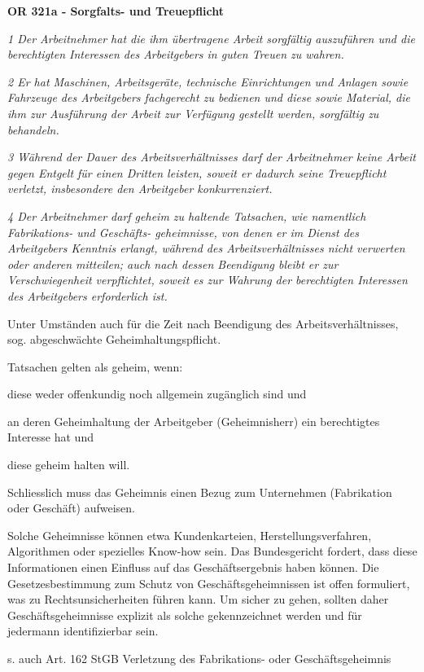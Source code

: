 \noindent
\textbf{OR 321a - Sorgfalts- und Treuepflicht}

\textit{1 Der Arbeitnehmer hat die ihm übertragene Arbeit sorgfältig auszuführen und die berechtigten Interessen des Arbeitgebers in guten Treuen zu wahren.}

\textit{2 Er hat Maschinen, Arbeitsgeräte, technische Einrichtungen und Anlagen sowie Fahrzeuge des Arbeitgebers fachgerecht zu bedienen und diese sowie Material, die ihm zur Ausführung der Arbeit zur Verfügung gestellt werden, sorgfältig zu behandeln.}

\textit{3 Während der Dauer des Arbeitsverhältnisses darf der Arbeitnehmer keine Arbeit gegen Entgelt für einen Dritten leisten, soweit er dadurch seine Treuepflicht verletzt, insbesondere den Arbeitgeber konkurrenziert.}

\textit{4 Der Arbeitnehmer darf geheim zu haltende Tatsachen, wie namentlich Fabrikations- und Geschäfts- geheimnisse, von denen er im Dienst des Arbeitgebers Kenntnis erlangt, während des Arbeitsverhältnisses nicht verwerten oder anderen mitteilen; auch nach dessen Beendigung bleibt er zur Verschwiegenheit verpflichtet, soweit es zur Wahrung der berechtigten Interessen des Arbeitgebers erforderlich ist.}
\vspace{3mm}

\noindent
Unter Umständen auch für die Zeit nach Beendigung des Arbeitsverhältnisses, sog. abgeschwächte Geheimhaltungspflicht.

\noindent
Tatsachen gelten als geheim, wenn: 

diese weder offenkundig noch allgemein zugänglich sind und

an deren Geheimhaltung der Arbeitgeber (Geheimnisherr) ein berechtigtes Interesse hat und

diese geheim halten will.

Schliesslich muss das Geheimnis einen Bezug zum Unternehmen (Fabrikation oder Geschäft) aufweisen.

Solche Geheimnisse können etwa Kundenkarteien, Herstellungsverfahren, Algorithmen oder spezielles Know-how sein.
Das Bundesgericht fordert, dass diese Informationen einen Einfluss auf das Geschäftsergebnis haben können.
Die Gesetzesbestimmung zum Schutz von Geschäftsgeheimnissen ist offen formuliert, was zu Rechtsunsicherheiten führen kann. Um sicher zu gehen, sollten daher Geschäftsgeheimnisse explizit als solche gekennzeichnet werden und für jedermann identifizierbar sein.

\noindent
s. auch Art. 162 StGB Verletzung des Fabrikations- oder Geschäftsgeheimnis
\vspace{3mm}

